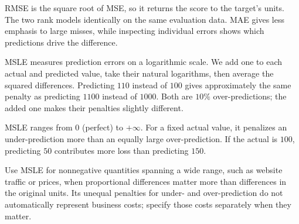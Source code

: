 \metricsecondary

RMSE is the square root of MSE, so it returns the score to the target's units. The two rank models identically on the same evaluation data. MAE gives less emphasis to large misses, while inspecting individual errors shows which predictions drive the difference.

\metricend
\clearpage
\thispagestyle{regressionstyle}
\label{sec:msle}

MSLE measures prediction errors on a logarithmic scale. We add one to each actual and predicted value, take their natural logarithms, then average the squared differences. Predicting $110$ instead of $100$ gives approximately the same penalty as predicting $1100$ instead of $1000$. Both are $10\%$ over-predictions; the added one makes their penalties slightly different.

\begin{metricformula}
\end{metricformula}

MSLE ranges from $0$ (perfect) to $+\infty$. For a fixed actual value, it penalizes an under-prediction more than an equally large over-prediction. If the actual is $100$, predicting $50$ contributes more loss than predicting $150$.


Use MSLE for nonnegative quantities spanning a wide range, such as website traffic or prices, when proportional differences matter more than differences in the original units. Its unequal penalties for under- and over-prediction do not automatically represent business costs; specify those costs separately when they matter.

